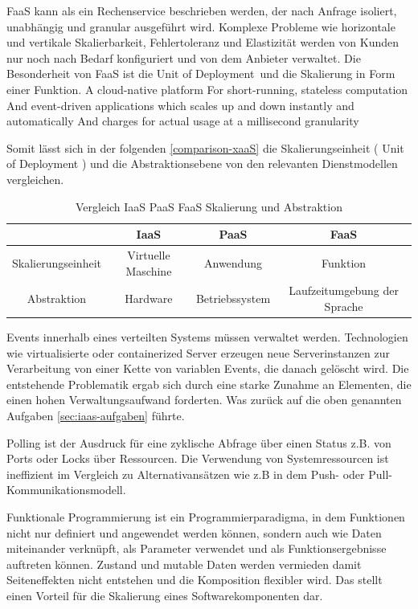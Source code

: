 \documentclass[
12pt,
english,
ngerman,
headsepline,
twoside,
openright,
numbers=noenddot,version=first
]{scrreprt}
\providecommand{\tabularnewline}{\\}
\begin{document}
\acrfull{FaaS}\label{sec:faas} kann als ein Rechenservice beschrieben werden, der nach Anfrage isoliert, unabhängig und granular ausgeführt wird. Komplexe Probleme wie horizontale und vertikale Skalierbarkeit, Fehlertoleranz und Elastizität werden von Kunden nur noch nach Bedarf konfiguriert und von dem Anbieter verwaltet. Die Besonderheit von \acrshort{FaaS} ist die \glqq Unit of Deployment\grqq\ und die Skalierung in Form einer Funktion. \cite{patternAWS}
A cloud-native platform
For short-running, stateless computation
And event-driven applications
which scales up and down instantly and
automatically
And charges for actual usage at a
millisecond granularity

Somit lässt sich in der folgenden \autoref{comparison-xaaS} die Skalierungseinheit ( Unit of Deployment ) und die Abstraktionsebene von den relevanten Dienstmodellen vergleichen. 
\begin{table}[H]
	\caption{Vergleich IaaS PaaS FaaS Skalierung und Abstraktion}
	\centering{}
	\label{comparison-xaaS}
	\begin{tabular}{ c | c c c }
		\noalign{\vskip\doublerulesep}
		& IaaS & PaaS & FaaS 
		\tabularnewline[\doublerulesep]	\hline	
		\noalign{\vskip\doublerulesep}
		Skalierungseinheit & Virtuelle Maschine & Anwendung & Funktion \tabularnewline
		Abstraktion & Hardware & Betriebssystem & Laufzeitumgebung der Sprache
	\end{tabular}

\end{table}

Events\label{par:event-reaction} innerhalb eines verteilten Systems müssen verwaltet werden. Technologien wie virtualisierte oder containerized Server erzeugen neue Serverinstanzen zur Verarbeitung von einer Kette von variablen Events, die danach gelöscht wird.\cite{lambdaAWS} Die entstehende Problematik ergab sich durch eine starke Zunahme an Elementen, die einen hohen Verwaltungsaufwand forderten.  Was zurück auf die oben genannten Aufgaben \autoref{sec:iaas-aufgaben} führte.

Polling\label{par:polling} ist der Ausdruck für eine zyklische Abfrage über einen Status z.B. von Ports oder Locks über Ressourcen. Die Verwendung von Systemressourcen ist ineffizient im Vergleich zu Alternativansätzen wie z.B in dem Push- oder Pull- Kommunikationsmodell.\cite{lambdaAWS} 

Funktionale Programmierung ist ein Programmierparadigma, in dem Funktionen nicht nur definiert und angewendet werden können, sondern auch wie Daten miteinander verknüpft, als Parameter verwendet und als Funktionsergebnisse auftreten können. Zustand und mutable Daten werden vermieden damit Seiteneffekten nicht entstehen und die Komposition flexibler wird. Das stellt einen Vorteil für die Skalierung eines Softwarekomponenten dar.\cite{funcScala}
\end{document}
